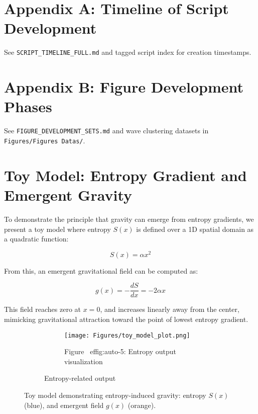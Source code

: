 \documentclass[12pt]{article}
\begin{document}
\appendix

\section{Appendix A: Timeline of Script Development}

See \texttt{SCRIPT\_TIMELINE\_FULL.md} and tagged script index for creation timestamps.

\section{Appendix B: Figure Development Phases}

See \texttt{FIGURE\_DEVELOPMENT\_SETS.md} and wave clustering datasets in \texttt{Figures/Figures~Datas/}.

\tableofcontents

\section{Toy Model: Entropy Gradient and Emergent Gravity}

To demonstrate the principle that gravity can emerge from entropy gradients, we present a toy model where entropy \( S(x) \) is defined over a 1D spatial domain as a quadratic function:

\[
S(x) = \alpha x^2
\]

From this, an emergent gravitational field can be computed as:

\[
g(x) = -\frac{dS}{dx} = -2\alpha x
\]

This field reaches zero at \( x = 0 \), and increases linearly away from the center, mimicking gravitational attraction toward the point of lowest entropy gradient.

\begin{figure}[H]
    \centering
    \begin{figure}[H]
\centering
\begin{figure}[H]
\centering
\texttt{[image: Figures/toy\_model\_plot.png]}
\caption{Figure~
ef{fig:auto-5}: Entropy output visualization}
\label{fig:auto-5}
\end{figure}
\caption{Entropy-related output}
\label{fig:Figures_toy_model_plot_png}
\end{figure}

    \caption{Toy model demonstrating entropy-induced gravity: entropy \ensuremath{S(x)} (blue), and emergent field \ensuremath{g(x)} (orange).}
    \label{fig:toy_model}
\end{figure}
\end{document}
